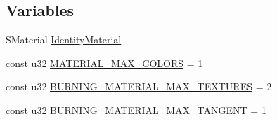 \subsection*{Variables}
\begin{DoxyCompactItemize}
\item 
S\-Material \hyperlink{namespaceirr_1_1video_a12da88e3e5717856a694b71bb8057e44}{Identity\-Material}
\item 
const u32 \hyperlink{namespaceirr_1_1video_a66cca5372745a72c68cd5d6393f7b1ec}{M\-A\-T\-E\-R\-I\-A\-L\-\_\-\-M\-A\-X\-\_\-\-C\-O\-L\-O\-R\-S} = 1
\item 
const u32 \hyperlink{namespaceirr_1_1video_a0fc910dd2ce2c4b8578bc00d289717f6}{B\-U\-R\-N\-I\-N\-G\-\_\-\-M\-A\-T\-E\-R\-I\-A\-L\-\_\-\-M\-A\-X\-\_\-\-T\-E\-X\-T\-U\-R\-E\-S} = 2
\item 
const u32 \hyperlink{namespaceirr_1_1video_a76070cedb9d83c174bb18311a6c9dcb8}{B\-U\-R\-N\-I\-N\-G\-\_\-\-M\-A\-T\-E\-R\-I\-A\-L\-\_\-\-M\-A\-X\-\_\-\-T\-A\-N\-G\-E\-N\-T} = 1
\end{DoxyCompactItemize}



